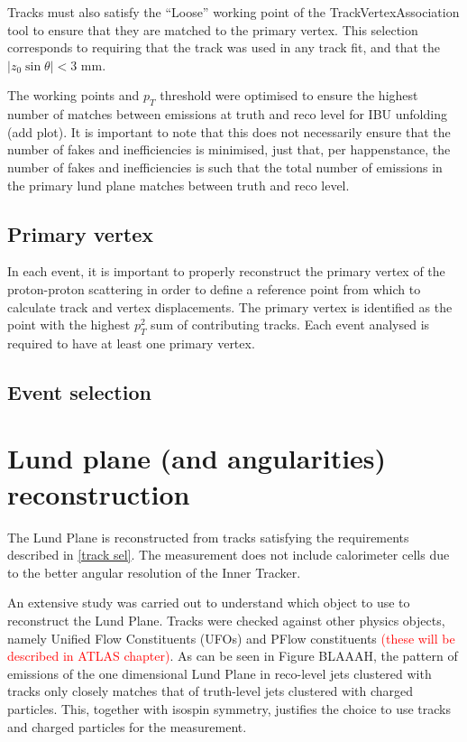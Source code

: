 \documentclass[10pt,a4paper]{book}
\newcommand{\todo}[1]{{\textcolor{red}{#1}}}
\begin{document}
Tracks must also satisfy the ``Loose'' working point of the TrackVertexAssociation tool to ensure that they are matched to the primary vertex. This selection corresponds to requiring that the track was used in any track fit, and that the $\vert z_0 \sin\theta \vert < 3$ mm.

The working points and $p_T$ threshold were optimised to ensure the highest number of matches between emissions at truth and reco level for IBU unfolding (add plot). It is important to note that this does not necessarily ensure that the number of fakes and inefficiencies is minimised, just that, per happenstance, the number of fakes and inefficiencies is such that the total number of emissions in the primary lund plane matches between truth and reco level.

\subsection{Primary vertex}

In each event, it is important to properly reconstruct the primary vertex of the proton-proton scattering in order to define a reference point from which to calculate track and vertex displacements. The primary vertex is identified as the point with the highest $p_T^2$ sum of contributing tracks. Each event analysed is required to have at least one primary vertex.

\subsection{Event selection}


\section{Lund plane (and angularities) reconstruction}

The Lund Plane is reconstructed from tracks satisfying the requirements described in \ref{track sel}. The measurement does not include calorimeter cells due to the better angular resolution of the Inner Tracker. 

An extensive study was carried out to understand which object to use to reconstruct the Lund Plane. Tracks were checked against other physics objects, namely Unified Flow Constituents (UFOs) and PFlow constituents \todo{(these will be described in ATLAS chapter)}. As can be seen in Figure BLAAAH, the pattern of emissions of the one dimensional Lund Plane in reco-level jets clustered with tracks only closely matches that of truth-level jets clustered with charged particles. This, together with isospin symmetry, justifies the choice to use tracks and charged particles for the measurement. 
\end{document}
